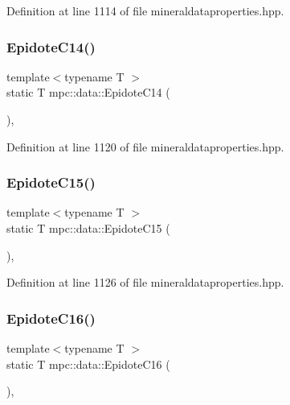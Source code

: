 Definition at line 1114 of file mineraldataproperties.\+hpp.

\mbox{\label{namespacempc_1_1data_a32738568652398c4127fe3f99df0a3c0}} 
\subsubsection{\texorpdfstring{Epidote\+C14()}{EpidoteC14()}}
{\footnotesize\ttfamily template$<$typename T $>$ \\
static T mpc\+::data\+::\+Epidote\+C14 (\begin{DoxyParamCaption}{ }\end{DoxyParamCaption})\hspace{0.3cm}{\ttfamily [inline]}, {\ttfamily [static]}}



Definition at line 1120 of file mineraldataproperties.\+hpp.

\mbox{\label{namespacempc_1_1data_ae2a0d3835d6cb4ea81d002370b8a8d1d}} 
\subsubsection{\texorpdfstring{Epidote\+C15()}{EpidoteC15()}}
{\footnotesize\ttfamily template$<$typename T $>$ \\
static T mpc\+::data\+::\+Epidote\+C15 (\begin{DoxyParamCaption}{ }\end{DoxyParamCaption})\hspace{0.3cm}{\ttfamily [inline]}, {\ttfamily [static]}}



Definition at line 1126 of file mineraldataproperties.\+hpp.

\mbox{\label{namespacempc_1_1data_a56a1f8623ec5d3f321c0bf3b05b3a082}} 
\subsubsection{\texorpdfstring{Epidote\+C16()}{EpidoteC16()}}
{\footnotesize\ttfamily template$<$typename T $>$ \\
static T mpc\+::data\+::\+Epidote\+C16 (\begin{DoxyParamCaption}{ }\end{DoxyParamCaption})\hspace{0.3cm}{\ttfamily [inline]}, {\ttfamily [static]}}



